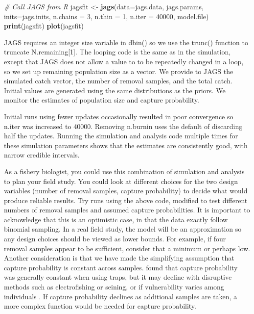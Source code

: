 \documentclass[
]{krantz}
\makeatletter
\newenvironment{Shaded}{\begin{snugshade}}{\end{snugshade}}
\newcommand{\AttributeTok}[1]{\textcolor[rgb]{0.27,0.27,0.27}{#1}}
\newcommand{\CommentTok}[1]{\textcolor[rgb]{0.37,0.37,0.37}{\textit{#1}}}
\newcommand{\DecValTok}[1]{\textcolor[rgb]{0.06,0.06,0.06}{#1}}
\newcommand{\FunctionTok}[1]{\textcolor[rgb]{0.27,0.27,0.27}{\textbf{#1}}}
\newcommand{\NormalTok}[1]{#1}
\newcommand{\OtherTok}[1]{\textcolor[rgb]{0.37,0.37,0.37}{#1}}
\newenvironment{kframe}{%
\medskip{}
\setlength{\fboxsep}{.8em}
 \def\at@end@of@kframe{}%
 \ifinner\ifhmode%
  \def\at@end@of@kframe{\end{minipage}}%
  \begin{minipage}{\columnwidth}%
 \fi\fi%
 \def\FrameCommand##1{\hskip\@totalleftmargin \hskip-\fboxsep
 \colorbox{shadecolor}{##1}\hskip-\fboxsep
     \hskip-\linewidth \hskip-\@totalleftmargin \hskip\columnwidth}%
 \MakeFramed {\advance\hsize-\width
   \@totalleftmargin\z@ \linewidth\hsize
   \@setminipage}}%
 {\par\unskip\endMakeFramed%
 \at@end@of@kframe}
\renewenvironment{Shaded}{\begin{kframe}}{\end{kframe}}
\makeatother
\begin{document}
\begin{Shaded}
\begin{Highlighting}[]
   \CommentTok{\# Call JAGS from R}
\NormalTok{  jagsfit }\OtherTok{\textless{}{-}} \FunctionTok{jags}\NormalTok{(}\AttributeTok{data=}\NormalTok{jags.data, jags.params, }\AttributeTok{inits=}\NormalTok{jags.inits,}
                  \AttributeTok{n.chains =} \DecValTok{3}\NormalTok{, }\AttributeTok{n.thin =} \DecValTok{1}\NormalTok{, }\AttributeTok{n.iter =} \DecValTok{40000}\NormalTok{,}
\NormalTok{                  model.file)}
  \FunctionTok{print}\NormalTok{(jagsfit)}
  \FunctionTok{plot}\NormalTok{(jagsfit)}
\end{Highlighting}
\end{Shaded}

JAGS requires an integer size variable in dbin() so we use the trunc() function to truncate N.remaining{[}1{]}. The looping code is the same as in the simulation, except that JAGS does not allow a value to to be repeatedly changed in a loop, so we set up remaining population size as a vector. We provide to JAGS the simulated catch vector, the number of removal samples, and the total catch. Initial values are generated using the same distributions as the priors. We monitor the estimates of population size and capture probability.

Initial runs using fewer updates occasionally resulted in poor convergence so n.iter was increased to 40000. Removing n.burnin uses the default of discarding half the updates. Running the simulation and analysis code multiple times for these simulation parameters shows that the estimates are consistently good, with narrow credible intervals.

As a fishery biologist, you could use this combination of simulation and analysis to plan your field study. You could look at different choices for the two design variables (number of removal samples, capture probability) to decide what would produce reliable results. Try runs using the above code, modified to test different numbers of removal samples and assumed capture probabilities. It is important to acknowledge that this is an optimistic case, in that the data exactly follow binomial sampling. In a real field study, the model will be an approximation so any design choices should be viewed as lower bounds. For example, if four removal samples appear to be sufficient, consider that a minimum or perhaps low. Another consideration is that we have made the simplifying assumption that capture probability is constant across samples. \citet{bryant2000} found that capture probability was generally constant when using traps, but it may decline with disruptive methods such as electrofishing or seining, or if vulnerability varies among individuals \citep{mantyniemi.etal2005}. If capture probability declines as additional samples are taken, a more complex function would be needed for capture probability.
\end{document}
